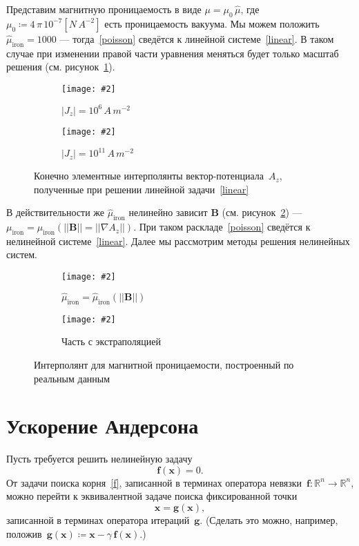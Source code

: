 \documentclass[a4paper, 14pt]{extarticle}
\newcommand{\includegraphicsw}[2][1.]{\texttt{[image: \#2]}}
\newcommand{\vect}[1]{\boldsymbol{\mathbf{#1}}}
\begin{document}
	Представим магнитную проницаемость в виде $\mu = \mu_0\,\hat\mu$, где $\mu_0 \coloneqq 4\,\pi\,10^{-7} \left[N\,A^{-2}\right]$ есть проницаемость вакуума. Мы можем положить $\hat\mu_{\text{iron}} = 1000$ --- тогда~\eqref{poisson} сведётся к линейной системе~\eqref{linear}. В таком случае при изменении правой части уравнения меняться будет только масштаб решения (см. рисунок~\ref{fig:linearA}). 
	
	\begin{figure}
		\centering
		\begin{subfigure}{.45\linewidth}
			\centering
			\includegraphicsw{l06.png}
			\caption{$|J_z| = 10^6\,A\,m^{-2}$}
		\end{subfigure}%
		\hfill
		\begin{subfigure}{.45\linewidth}
			\centering
			\includegraphicsw{l11.png}
			\caption{$|J_z| = 10^{11}\,A\,m^{-2}$}
		\end{subfigure}
		\caption{Конечно элементные интерполянты вектор-потенциала~$A_z$, полученные при решении линейной задачи~\eqref{linear}}
		\label{fig:linearA}
	\end{figure}
	
	В действительности же $\hat\mu_{\text{iron}}$ нелинейно зависит $\vect B$ (см. рисунок~\ref{mu}) --- $\mu_{\text{iron}} = \mu_{\text{iron}}(||\vect B|| = ||\nabla A_z||)$. При таком раскладе~\eqref{poisson} сведётся к нелинейной системе~\eqref{linear}. Далее мы рассмотрим методы решения нелинейных систем. 
	
	\begin{figure}[b!]
		\centering
		\begin{subfigure}{.45\linewidth}
			\centering
			\includegraphicsw{interp.pdf}
			\caption{$\hat\mu_{\text{iron}} = \hat{\mu}_{\text{iron}}(||\vect B||)$}
		\end{subfigure}%
		\hfill
		\begin{subfigure}{.45\linewidth}
			\centering
			\includegraphicsw{extrap.pdf}
			\caption{Часть с экстраполяцией}
		\end{subfigure}
		\caption{Интерполянт для магнитной проницаемости, построенный по реальным данным}
		\label{mu}
	\end{figure}
	
	\section{Ускорение Андерсона}
	
	Пусть требуется решить нелинейную задачу
	\begin{equation}\label{f}
		\vect f(\vect x) = 0.
	\end{equation}
	От задачи поиска корня~\eqref{f}, записанной в терминах оператора невязки~${\vect f : \mathbb R^n \rightarrow \mathbb R^n}$, можно перейти к эквивалентной задаче поиска фиксированной точки
	\begin{equation}\label{g}
		\vect x = \vect g(\vect x),
	\end{equation}
	записанной в терминах оператора итераций~$\vect g$. (Сделать это можно, например, положив~$\vect g(\vect x) \coloneqq \vect x - \gamma\,\vect f(\vect x)$.)
	
\end{document}
